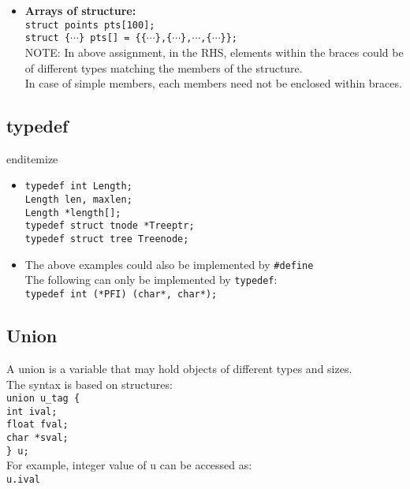 \begin{itemize}
\item \textbf{Arrays of structure:}\\
\texttt{struct points pts[100];}\\
\texttt{struct \{$\cdots$\} pts[] = \{\{$\cdots$\},\{$\cdots$\},$\cdots$,\{$\cdots$\}\};}\\
NOTE: In above assignment, in the RHS, elements within the braces could be of different types matching the members of the structure.\\
In case of simple members, each members need not be enclosed within braces.\\
 
\end{itemize}

\subsection{typedef}
end{itemize}
\begin{itemize}
	\item
		\texttt{typedef int Length;}\\
		\texttt{Length len, maxlen;}\\
		\texttt{Length *length[];}\\
		\texttt{typedef struct tnode *Treeptr;}\\
		\texttt{typedef struct tree Treenode;}\\
	\item The above examples could also be implemented by \texttt{\#define}\\
		The following can only be implemented by \texttt{typedef}:\\
		\texttt{typedef int (*PFI) (char*, char*);}
\end{itemize}

\subsection{Union}
A union is a variable that may hold objects of different types and sizes.\\
The syntax is based on structures:\\
\texttt{union u\_tag \{}\\
\texttt{\qquad int ival;}\\
\texttt{\qquad float fval;}\\
\texttt{\qquad char *sval;}\\
\texttt{\} u;}\\

For example, integer value of u can be accessed as:\\
\texttt{u.ival}

